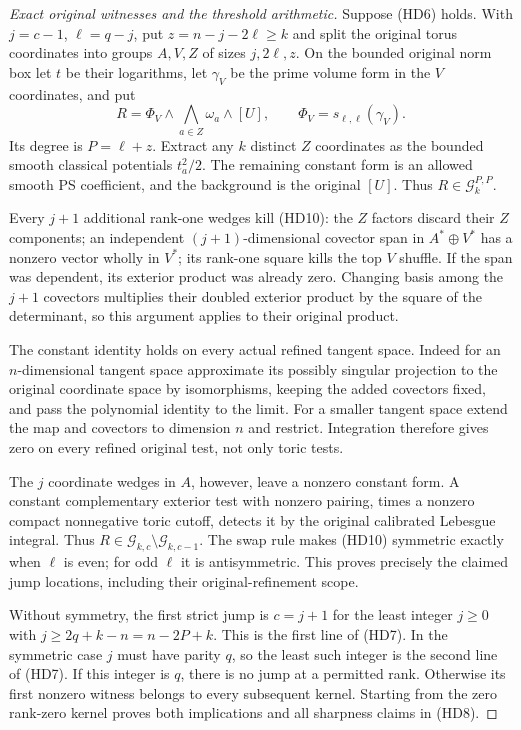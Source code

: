 \documentclass[11pt,a4paper]{article}
\numberwithin{equation}{section}
\theoremstyle{definition}
\theoremstyle{remark}
\begin{document}
\begin{proof}[Exact original witnesses and the threshold arithmetic]
Suppose (HD6) holds. With $j=c-1$, $\ell=q-j$, put
$z=n-j-2\ell\ge k$ and split the original torus coordinates into
groups $A,V,Z$ of sizes $j,2\ell,z$. On the bounded original norm
box let $t$ be their logarithms, let $\gamma_V$ be the prime volume
form in the $V$ coordinates, and put
\[
 R=\Phi_V\wedge\bigwedge_{a\in Z}\omega_a\wedge[U],
                 \qquad \Phi_V=s_{\ell,\ell}(\gamma_V).
 \tag{HD10}
\]
Its degree is $P=\ell+z$. Extract any $k$ distinct $Z$ coordinates
as the bounded smooth classical potentials $t_a^2/2$. The remaining
constant form is an allowed smooth PS coefficient, and the background
is the original $[U]$. Thus $R\in\mathscr G_k^{P,P}$.

Every $j+1$ additional rank-one wedges kill (HD10): the $Z$ factors
discard their $Z$ components; an independent $(j+1)$-dimensional
covector span in $A^*\oplus V^*$ has a nonzero vector wholly in
$V^*$; its rank-one square kills the top $V$ shuffle. If the span
was dependent, its exterior product was already zero. Changing
basis among the $j+1$ covectors multiplies their doubled exterior
product by the square of the determinant, so this argument applies
to their original product.

The constant identity holds on every actual refined tangent space.
Indeed for an $n$-dimensional tangent space approximate its possibly
singular projection to the original coordinate space by isomorphisms,
keeping the added covectors fixed, and pass the polynomial identity
to the limit. For a smaller tangent space extend the map and covectors
to dimension $n$ and restrict. Integration therefore gives zero on
every refined original test, not only toric tests.

The $j$ coordinate wedges in $A$, however, leave a nonzero constant
form. A constant complementary exterior test with nonzero pairing,
times a nonzero compact nonnegative toric cutoff, detects it by the
original calibrated Lebesgue integral. Thus
$R\in\mathscr G_{k,c}\setminus\mathscr G_{k,c-1}$.
The swap rule makes (HD10) symmetric exactly when $\ell$ is even;
for odd $\ell$ it is antisymmetric. This proves precisely the
claimed jump locations, including their original-refinement scope.

Without symmetry, the first strict jump is $c=j+1$ for the least
integer $j\ge0$ with $j\ge2q+k-n=n-2P+k$. This is the first line
of (HD7). In the symmetric case $j$ must have parity $q$, so the
least such integer is the second line of (HD7). If this integer is
$q$, there is no jump at a permitted rank. Otherwise its first
nonzero witness belongs to every subsequent kernel. Starting from
the zero rank-zero kernel proves both implications and all sharpness
claims in (HD8).
\end{proof}
\end{document}
